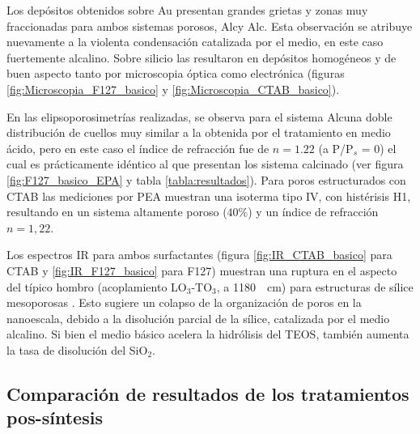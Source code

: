 		 Los depósitos obtenidos sobre Au presentan grandes grietas y zonas muy fraccionadas para ambos sistemas porosos, Alc\pdmF\space y Alc\pdmC. Esta observación se atribuye nuevamente a la violenta condensación catalizada por el medio, en este caso fuertemente alcalino. Sobre silicio las \pdm\space resultaron en depósitos homogéneos y de buen aspecto tanto por microscopia óptica como electrónica (figuras \ref{fig:Microscopia_F127_basico} y \ref{fig:Microscopia_CTAB_basico}).

		 En las elipsoporosimetrías realizadas, se observa para el sistema Alc\pdmF\space una doble distribución de cuellos muy similar a la obtenida por el tratamiento en medio ácido, pero en este caso el índice de refracción fue de $n=1.22$ (a P/P$_s$ = 0) el cual es prácticamente idéntico al que presentan los sistema calcinado (ver figura \ref{fig:F127_basico_EPA} y tabla \ref{tabla:resultados}). Para poros estructurados con CTAB las mediciones por PEA muestran una isoterma tipo IV, con histérisis H1, resultando en un sistema altamente poroso ($40\%$) y un índice de refracción $n=1,22$.
	
		 Los espectros IR para ambos surfactantes (figura \ref{fig:IR_CTAB_basico} para CTAB y \ref{fig:IR_F127_basico} para F127) muestran una ruptura en el aspecto del típico hombro (acoplamiento LO$_3$-TO$_3$, a \SI{1180}{\per\cm}) para estructuras de sílice mesoporosas \cite{Olsen1989,Innocenzi2003,Angelome2008}. Esto sugiere un colapso de la organización de poros en la nanoescala, debido a la disolución parcial de la sílice, catalizada por el medio alcalino. Si bien el medio básico acelera la hidrólisis del TEOS, también aumenta la tasa de disolución del SiO$_2$.\cite{Mazer1994,Niibori2000,Gorrepati2010}

	 \subsection{Comparación de resultados de los tratamientos pos-síntesis}
	 		
